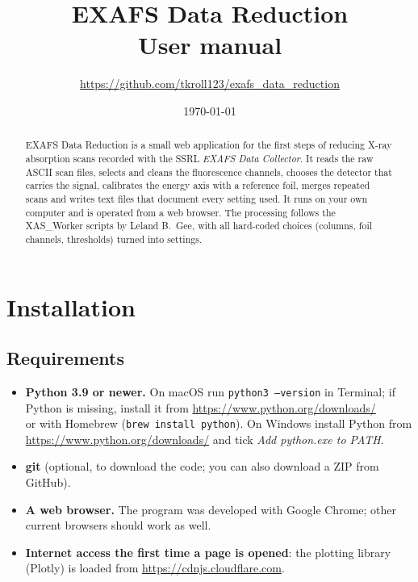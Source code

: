 \documentclass[11pt,a4paper]{article}
\title{\textbf{EXAFS Data Reduction}\\[4pt]
  \large User manual}
\date{\today}
\author{\url{https://github.com/tkroll123/exafs_data_reduction}}
\begin{document}
\maketitle

\begin{abstract}
\noindent EXAFS Data Reduction is a small web application for the first steps of
reducing X-ray absorption scans recorded with the SSRL \emph{EXAFS Data Collector}.
It reads the raw ASCII scan files, selects and cleans the fluorescence channels,
chooses the detector that carries the signal, calibrates the energy axis with a
reference foil, merges repeated scans and writes text files that document every
setting used. It runs on your own computer and is operated from a web browser.
The processing follows the XAS\_Worker scripts by Leland B.\ Gee, with all
hard-coded choices (columns, foil channels, thresholds) turned into settings.
\end{abstract}

\tableofcontents
\newpage

\section{Installation}

\subsection{Requirements}
\begin{itemize}
  \item \textbf{Python 3.9 or newer.} On macOS run \texttt{python3 --version} in Terminal; if
        Python is missing, install it from \url{https://www.python.org/downloads/}\\ or
        with Homebrew (\texttt{brew install python}). On Windows install Python from
        \url{https://www.python.org/downloads/} and tick \emph{Add python.exe to PATH}.
  \item \textbf{git} (optional, to download the code; you can also download a ZIP from GitHub).
  \item \textbf{A web browser.} The program was developed with Google Chrome; other current browsers
        should work as well.
  \item \textbf{Internet access the first time a page is opened}: the plotting library
        (Plotly) is loaded from \url{https://cdnjs.cloudflare.com}.
\end{itemize}
\end{document}
